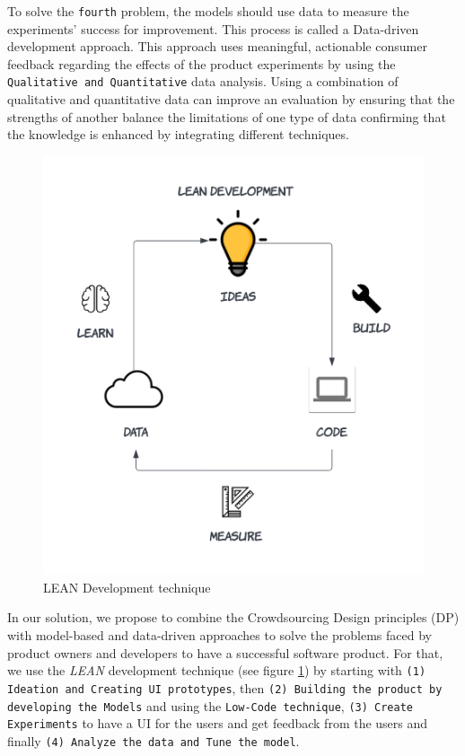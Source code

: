 To solve the \texttt{fourth} problem, the models should use data to measure the experiments' success for improvement. This process is called a Data-driven development approach. 
This approach uses meaningful, actionable consumer feedback regarding the effects of the product experiments by using the \texttt{Qualitative and Quantitative} data analysis.
Using a combination of qualitative and quantitative data can improve an evaluation by ensuring that the strengths of another balance the limitations of one type of data confirming that the knowledge is enhanced by integrating different techniques.

\begin{figure}[ht]
    \centering
    \includegraphics[scale=0.15]{images/solution-ideas/LEAN.png}
    \caption{LEAN Development technique}
    \label{intro:fig:lean}
\end{figure}
\par
In our solution, we propose to combine the Crowdsourcing Design principles (DP) \cite{misc:crowdsourcing:sg} with model-based and data-driven approaches to solve the problems faced by product owners and developers to have a successful software product.
For that, we use the \emph{LEAN} development technique (see figure \ref{intro:fig:lean}) by starting with \texttt{(1) Ideation and Creating UI prototypes}, then \texttt{(2) Building the product by developing the Models} and using the \texttt{Low-Code technique}, \texttt{(3) Create Experiments} to have a UI for the users and get feedback from the users and finally \texttt{(4) Analyze the data and Tune the model}.